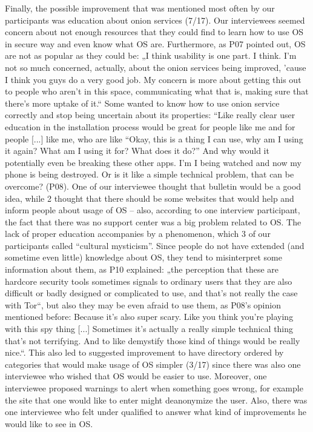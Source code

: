 Finally, the possible improvement that was mentioned most often by our participants was education about onion services (7/17). Our interviewees seemed concern about not enough resources that they could find to learn how to use OS in secure way and even know what OS are. Furthermore, as P07 pointed out, OS are not as popular as they could be: „I think usability is one part. I think. I'm not so much concerned, actually, about the onion services being improved, 'cause I think you guys do a very good job. My concern is more about getting this out to people who aren't in this space, communicating what that is, making sure that there's more uptake of it.“
 Some wanted to know how to use onion service correctly and stop being uncertain about its properties: ``Like really clear user education in the installation process would be great for people like me and for people [...] like me, who are like ``Okay, this is a thing I can use, why am I using it again? What am I using it for? What does it do?'' And why would it potentially even be breaking these other apps. I'm I being watched and now my phone is being destroyed. Or is it like a simple technical problem, that can be overcome? (P08). One of our interviewee thought that bulletin would be a good idea, while 2 thought that there should be some websites that would help and inform people about usage of OS – also, according to one interview participant, the fact that there was no support center was a big problem related to OS. 
The lack of proper education accompanies by a phenomenon, which 3 of our participants called ``cultural mysticism''. Since people do not have extended (and sometime even little) knowledge about OS, they tend to misinterpret some information about them, as P10 explained: „the perception that these are hardcore security tools sometimes signals to ordinary users that they are also difficult or badly designed or complicated to use, and that's not really the case with Tor“, but also they may be even afraid to use them, as P08’s opinion mentioned before: Because it's also super scary. Like you think you're playing with this spy thing [...] Sometimes it's actually a really simple technical thing that's not terrifying. And to like demystify those kind of things would be really nice.“. This also led to suggested improvement to have directory ordered by categories that would make usage of OS simpler (3/17) since there was also one interviewee who wished that OS would be easier to use. Moreover, one interviewee proposed warnings to alert when something goes wrong, for example the site that one would like to enter might deanonymize the user. Also, there was one interviewee who felt under qualified to answer what kind of improvements he would like to see in OS.
